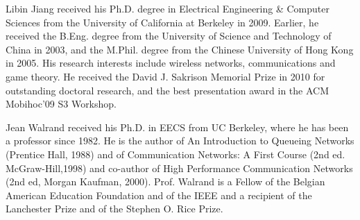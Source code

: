 \documentclass{IEEEtran}
\begin{document}
\begin{biography}
{Libin Jiang} received his Ph.D. degree in Electrical Engineering
\& Computer Sciences from the University of California at Berkeley
in 2009. Earlier, he received the B.Eng. degree from the University
of Science and Technology of China in 2003, and the M.Phil. degree
from the Chinese University of Hong Kong in 2005. His research interests
include wireless networks, communications and game theory. He received
the David J. Sakrison Memorial Prize in 2010 for outstanding doctoral
research, and the best presentation award in the ACM Mobihoc'09 S3
Workshop.
\end{biography}

\begin{biography}
{Jean Walrand}  received his Ph.D. in EECS from UC Berkeley, where
he has been a professor since 1982. He is the author of An Introduction
to Queueing Networks (Prentice Hall, 1988) and of Communication Networks:
A First Course (2nd ed. McGraw-Hill,1998) and co-author of High Performance
Communication Networks (2nd ed, Morgan Kaufman, 2000). Prof. Walrand
is a Fellow of the Belgian American Education Foundation and of the
IEEE and a recipient of the Lanchester Prize and of the Stephen O.
Rice Prize.
\end{biography}
\end{document}
